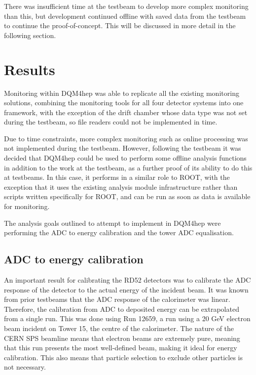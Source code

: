 There was insufficient time at the testbeam to develop more complex monitoring than this, but development continued offline with saved data from the testbeam to continue the proof-of-concept. This will be discussed in more detail in the following section.

\section{Results}
Monitoring within \acrshort{DQM4hep} was able to replicate all the existing monitoring solutions, combining the monitoring tools for all four detector systems into one framework, with the exception of the drift chamber whose data type was not set during the testbeam, so file readers could not be implemented in time. 

Due to time constraints, more complex monitoring such as online processing was not implemented during the testbeam. However, following the testbeam it was decided that \acrshort{DQM4hep} could be used to perform some offline analysis functions in addition to the work at the testbeam, as a further proof of its ability to do this at testbeams. In this case, it performs in a similar role to ROOT, with the exception that it uses the existing analysis module infrastructure rather than scripts written specifically for ROOT, and can be run as soon as data is available for monitoring.

The analysis goals outlined to attempt to implement in \acrshort{DQM4hep} were performing the \acrshort{ADC} to energy calibration and the tower \acrshort{ADC} equalisation.

\subsection{ADC to energy calibration}


An important result for calibrating the RD52 detectors was to calibrate the \acrshort{ADC} response of the detector to the actual energy of the incident beam. It was known from prior testbeams that the \acrshort{ADC} response of the calorimeter was linear. Therefore, the calibration from \acrshort{ADC} to deposited energy can be extrapolated from a single run. This was done using Run 12659, a run using a 20 GeV electron beam incident on Tower 15, the centre of the calorimeter. The nature of the \acrshort{CERN} \acrshort{SPS} beamline means that electron beams are extremely pure, meaning that this run presents the most well-defined beam, making it ideal for energy calibration. This also means that particle selection to exclude other particles is not necessary.


